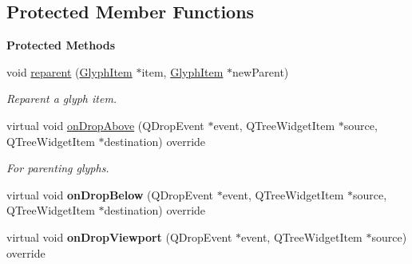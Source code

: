 \subsection*{Protected Member Functions}
\begin{Indent}\textbf{ Protected Methods}\par
\begin{DoxyCompactItemize}
\item 
\mbox{\label{classrev_1_1_view_1_1_canvas_glyph_widget_af31097b61ba463b1a4a69cb18fafcac8}} 
void \mbox{\hyperlink{classrev_1_1_view_1_1_canvas_glyph_widget_af31097b61ba463b1a4a69cb18fafcac8}{reparent}} (\mbox{\hyperlink{classrev_1_1_view_1_1_glyph_item}{Glyph\+Item}} $\ast$item, \mbox{\hyperlink{classrev_1_1_view_1_1_glyph_item}{Glyph\+Item}} $\ast$new\+Parent)
\begin{DoxyCompactList}\small\item\em Reparent a glyph item. \end{DoxyCompactList}\item 
\mbox{\label{classrev_1_1_view_1_1_canvas_glyph_widget_aa0881b89bc049ced705bb8717ae05492}} 
virtual void \mbox{\hyperlink{classrev_1_1_view_1_1_canvas_glyph_widget_aa0881b89bc049ced705bb8717ae05492}{on\+Drop\+Above}} (Q\+Drop\+Event $\ast$event, Q\+Tree\+Widget\+Item $\ast$source, Q\+Tree\+Widget\+Item $\ast$destination) override
\begin{DoxyCompactList}\small\item\em For parenting glyphs. \end{DoxyCompactList}\item 
\mbox{\label{classrev_1_1_view_1_1_canvas_glyph_widget_adaeada05255148ecf8c8292bbd9a1fbc}} 
virtual void {\bfseries on\+Drop\+Below} (Q\+Drop\+Event $\ast$event, Q\+Tree\+Widget\+Item $\ast$source, Q\+Tree\+Widget\+Item $\ast$destination) override
\item 
\mbox{\label{classrev_1_1_view_1_1_canvas_glyph_widget_ae8f4a379f2f466c70bd4fee2700a4536}} 
virtual void {\bfseries on\+Drop\+Viewport} (Q\+Drop\+Event $\ast$event, Q\+Tree\+Widget\+Item $\ast$source) override
\item 
\mbox{\label{classrev_1_1_view_1_1_canvas_glyph_widget_a14e167afed0f4b26c105d2895da8b099}} 

\end{DoxyCompactItemize}
\end{Indent}
